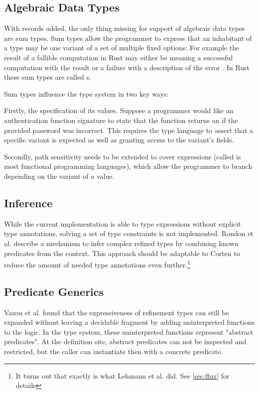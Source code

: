 \documentclass[twoside, english]{sdqthesis}
\theoremstyle{definition}
\begin{document}
\subsection{Algebraic Data Types}

With records added, the only thing missing for support of algebraic data types are sum types.
Sum types allow the programmer to express that an inhabitant of a type may be one variant of a set of multiple fixed options: For example the result of a fallible computation in Rust may either be  meaning a successful computation with the result  or a failure  with a description of the error .
In Rust these sum types are called s.

Sum types influence the type system in two key ways: 

Firstly, the specification of its values. Suppose a programmer would like an authentication function signature to state that the function returns an  if the provided password was incorrect. This requires the type language to assert that a specific variant is expected as well as granting access to the variant's fields.

Secondly, path sensitivity needs to be extended to cover  expressions (called  is most functional programming languages), which allow the programmer to branch depending on the variant of a value.

\subsection{Inference}

While the current implementation is able to type expressions without explicit type annotations, solving a set of type constraints is not implemented. 
Rondon et al. \cite{rondon_liquid_2008} describe a mechanism to infer complex refined types by combining known predicates from the context. This approach should be adaptable to Corten to reduce the amount of needed type annotations even further.\footnote{It turns out that exactly is what Lehmann et al. \cite{lehmann_flux_2022} did. See \cref{sec:flux} for details}


\subsection{Predicate Generics}

Vazou et al. \cite{vazou_abstract_2013} found that the expressiveness of refinement types can still be expanded without leaving a decidable fragment by adding uninterpreted functions to the logic. In the type system, these uninterpreted functions represent "abstract predicates". At the definition site, abstract predicates can not be inspected and restricted, but the caller can instantiate then with a concrete predicate.
\end{document}
